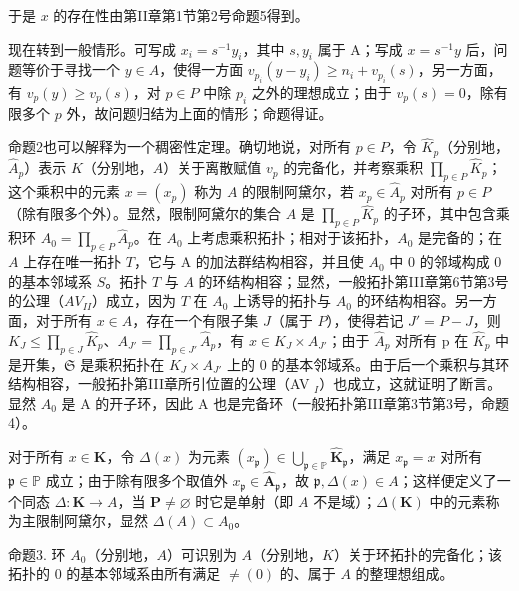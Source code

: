 于是 \(x\) 的存在性由第II章第1节第2号命题5得到。

现在转到一般情形。可写成 \(x_{i} = s^{-1}y_{i}\)，其中 \(s, y_{i}\) 属于 A；写成 \(x = s^{-1}y\) 后，问题等价于寻找一个 \(y \in A\)，使得一方面 \(v_{p_i}(y - y_i) \geqslant n_i + v_{p_i}(s)\)，另一方面，有 \(v_{p}(y) \geqslant v_{p}(s)\)，对 \(p \in P\) 中除 \(p_i\) 之外的理想成立；由于 \(v_{p}(s) = 0\)，除有限多个 \(p\) 外，故问题归结为上面的情形；命题得证。

命题2也可以解释为一个稠密性定理。确切地说，对所有 \(p \in P\)，令 \(\hat{K}_p\)（分别地，\(\hat{A}_p\)）表示 \(K\)（分别地，\(A\)）关于离散赋值 \(v_p\) 的完备化，并考察乘积 \(\prod_{p \in P} \hat{K}_p\)；这个乘积中的元素 \(x = (x_p)\) 称为 \(A\) 的限制阿黛尔，若 \(x_p \in \hat{A}_p\) 对所有 \(p \in P\)（除有限多个外）。显然，限制阿黛尔的集合 \(A\) 是 \(\prod_{p \in P} \hat{K}_p\) 的子环，其中包含乘积环 \(A_0 = \prod_{p \in P} \hat{A}_p\)。在 \(A_0\) 上考虑乘积拓扑；相对于该拓扑，\(A_0\) 是完备的；在 \(A\) 上存在唯一拓扑 \(T\)，它与 A 的加法群结构相容，并且使 \(A_0\) 中 0 的邻域构成 0 的基本邻域系 \(S\)。拓扑 \(T\) 与 \(A\) 的环结构相容；显然，一般拓扑第III章第6节第3号的公理（\(AV_{II}\)）成立，因为 \(T\) 在 \(A_0\) 上诱导的拓扑与 \(A_0\) 的环结构相容。另一方面，对于所有 \(x \in A\)，存在一个有限子集 \(J\)（属于 \(P\)），使得若记 \(J' = P - J\)，则 \(K_J \leqslant \prod_{p \in J} \hat{K}_p\)、\(A_{J'} = \prod_{p \in J'} \hat{A}_p\)，有 \(x \in K_{J} \times A_{J'}\)；由于 \(\hat{A}_{p}\) 对所有 p 在 \(\hat{K}_{p}\) 中是开集，\(\mathfrak{S}\) 是乘积拓扑在 \(K_{J} \times A_{J'}\) 上的 0 的基本邻域系。由于后一个乘积与其环结构相容，一般拓扑第III章所引位置的公理（AV \(_{I}\)）也成立，这就证明了断言。显然 \(A_{0}\) 是 A 的开子环，因此 A 也是完备环（一般拓扑第III章第3节第3号，命题4）。

对于所有 \(x \in \mathbf{K}\)，令 \(\Delta(x)\) 为元素 \((x_{\mathfrak{p}}) \in \bigcup_{\mathfrak{p} \in \mathbb{P}} \hat{\mathbf{K}}_{\mathfrak{p}}\)，满足 \(x_{\mathfrak{p}} = x\) 对所有 \(\mathfrak{p} \in \mathbb{P}\) 成立；由于除有限多个取值外 \(x_{\mathfrak{p}} \in \hat{\mathbf{A}}_{\mathfrak{p}}\)，故 \(\mathfrak{p}, \Delta(x) \in A\)；这样便定义了一个同态 \(\Delta: \mathbf{K} \to A\)，当 \(\mathbf{P} \neq \varnothing\) 时它是单射（即 \(A\) 不是域）；\(\Delta(\mathbf{K})\) 中的元素称为主限制阿黛尔，显然 \(\Delta(A) \subset A_0\)。

命题3. 环 \(A_0\)（分别地，\(A\)）可识别为 \(A\)（分别地，\(K\)）关于环拓扑的完备化；该拓扑的 0 的基本邻域系由所有满足 \(\neq (0)\) 的、属于 \(A\) 的整理想组成。


